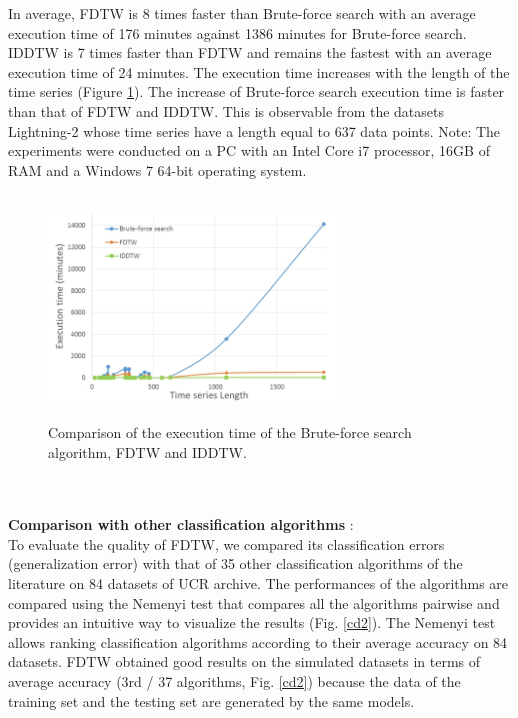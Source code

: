 In average, FDTW is 8 times faster than Brute-force search with an average execution time of 176 minutes
against 1386 minutes for Brute-force search. IDDTW is 7 times faster than FDTW and remains
the fastest with an average execution time of 24 minutes. The execution time increases with the length of the time series (Figure 
\ref{tempsDeCalcul}). The increase of Brute-force search execution time is faster than that of FDTW
and IDDTW. This is observable from the datasets Lightning-2 whose time series have a length equal
to 637 data points. Note: The experiments were conducted on a PC with an Intel Core i7 processor, 16GB of RAM and a Windows 7 64-bit operating system.

\begin{figure}[h]
\center
\includegraphics[width=18pc,height=14pc]{images/tempsDeCalcul2.jpg}
\caption{Comparison of the execution time of
the Brute-force search algorithm, FDTW and IDDTW. }

\label{tempsDeCalcul}

\end{figure}



\\
 \paragraph{}\textbf{Comparison with other classification algorithms} : \\
To evaluate the quality of FDTW, we compared its classification errors (generalization error) with that of 35 other classification algorithms \cite{bagnall2016great} of the literature on 84 datasets of UCR archive{{}}.
 The performances of the algorithms are compared using 
the Nemenyi test that compares all the algorithms pairwise and  provides an intuitive way to
visualize the results (Fig. \ref{cd2}). The Nemenyi test allows ranking  classification algorithms according to their average accuracy on 84 datasets.
 FDTW obtained good results on the simulated datasets in terms of average accuracy (3rd / 37 algorithms, Fig. \ref{cd2}) because the data of the training set and the testing set are generated by the same models.

